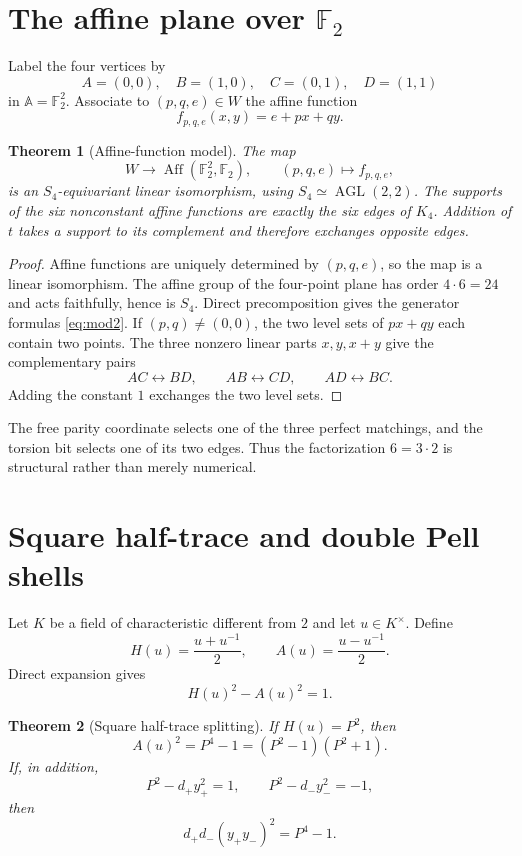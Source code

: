 \documentclass[11pt]{amsart}
\newtheorem{theorem}{Theorem}[section]
\theoremstyle{definition}
\theoremstyle{remark}
\newcommand{\F}{\mathbb F}
\newcommand{\Aff}{\operatorname{Aff}}
\begin{document}
\section{The affine plane over $\F_2$}\label{sec:affine}

Label the four vertices by
\[
 A=(0,0),\quad B=(1,0),\quad C=(0,1),\quad D=(1,1)
\]
in $\mathbb A=\F_2^2$. Associate to $(p,q,e)\in W$ the affine function
\[
 f_{p,q,e}(x,y)=e+px+qy.
\]

\begin{theorem}[Affine-function model]\label{thm:affine}
The map
\[
 W\longrightarrow\Aff(\F_2^2,\F_2),\qquad
 (p,q,e)\longmapsto f_{p,q,e},
\]
is an $S_4$-equivariant linear isomorphism, using $S_4\simeq\operatorname{AGL}(2,2)$. The supports of the six nonconstant affine functions are exactly the six edges of $K_4$. Addition of $t$ takes a support to its complement and therefore exchanges opposite edges.
\end{theorem}

\begin{proof}
Affine functions are uniquely determined by $(p,q,e)$, so the map is a linear isomorphism. The affine group of the four-point plane has order $4\cdot6=24$ and acts faithfully, hence is $S_4$. Direct precomposition gives the generator formulas \eqref{eq:mod2}. If $(p,q)\ne(0,0)$, the two level sets of $px+qy$ each contain two points. The three nonzero linear parts $x,y,x+y$ give the complementary pairs
\[
 AC\leftrightarrow BD,\qquad
 AB\leftrightarrow CD,\qquad
 AD\leftrightarrow BC.
\]
Adding the constant $1$ exchanges the two level sets.
\end{proof}

The free parity coordinate selects one of the three perfect matchings, and the torsion bit selects one of its two edges. Thus the factorization $6=3\cdot2$ is structural rather than merely numerical.

\section{Square half-trace and double Pell shells}\label{sec:pell}

Let $K$ be a field of characteristic different from $2$ and let $u\in K^\times$. Define
\[
 H(u)=\frac{u+u^{-1}}2,\qquad
 A(u)=\frac{u-u^{-1}}2.
\]
Direct expansion gives
\[
 H(u)^2-A(u)^2=1.
\]

\begin{theorem}[Square half-trace splitting]\label{thm:halftrace}
If $H(u)=P^2$, then
\[
 A(u)^2=P^4-1=(P^2-1)(P^2+1).
\]
If, in addition,
\[
 P^2-d_+y_+^2=1,\qquad
 P^2-d_-y_-^2=-1,
\]
then
\[
 d_+d_-(y_+y_-)^2=P^4-1.
\]
\end{theorem}
\end{document}
